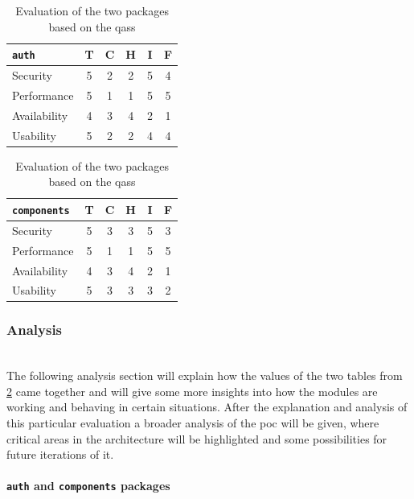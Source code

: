 \begin{table}[h!]
    \centering
    \begin{tabular}{| l | c | c | c | c | c |} 
     \hline
     \texttt{auth} & T & C & H & I & F \\
     \hline
     Security & 5 & 2 & 2 & 5 & \cellcolor{red!25}4\\
     \hline
     Performance & 5 & 1 & 1 & 5 & \cellcolor{red!50}5\\
     \hline
     Availability & 4 & 3 & 4 & 2 & \cellcolor{green!25}1\\
     \hline
     Usability & 5 & 2 & 2 & 4 & \cellcolor{red!25}4\\
     \hline
    \end{tabular}
    \quad
    \begin{tabular}{| l | c | c | c | c | c |} 
     \hline
     \texttt{components} & T & C & H & I & F \\
     \hline
     Security & 5 & 3 & 3 & 5 & \cellcolor{orange!50}3\\
     \hline
     Performance & 5 & 1 & 1 & 5 & \cellcolor{red!50}5\\
     \hline
     Availability & 4 & 3 & 4 & 2 & \cellcolor{green!25}1\\
     \hline
     Usability & 5 & 3 & 3 & 3 & \cellcolor{green!25}2\\
     \hline
    \end{tabular}
    \vspace{0.75cm}
    \caption{Evaluation of the two packages based on the \glspl{qas}}
    \label{table:poc1-evaluation}
\end{table}

\subsubsection{Analysis}\mbox{}\\

The following analysis section will explain how the values of the two tables from \ref{table:poc1-evaluation} came together and will give some more insights into how the modules are working and behaving in certain situations. After the explanation and analysis of this particular evaluation a broader analysis of the \gls{poc} will be given, where critical areas in the architecture will be highlighted and some possibilities for future iterations of it.
\vspace{0.5cm}
\paragraph{\texttt{auth} and \texttt{components} packages}\mbox{}\\

